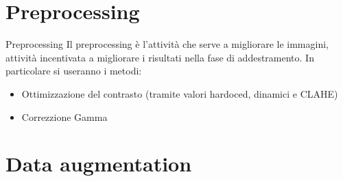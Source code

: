 \documentclass[aspectratio=169]{beamer}
\begin{document}
\section{Preprocessing}
\begin{frame}{Preprocessing}
    Il preprocessing è l'attività che serve a migliorare le immagini, attività incentivata a migliorare i risultati nella fase di addestramento. In particolare si useranno i metodi:
    \begin{itemize}
        \item Ottimizzazione del contrasto (tramite valori hardoced, dinamici e CLAHE)
        \item Correzzione Gamma
    \end{itemize}
\end{frame}

\section{Data augmentation}
\end{document}
